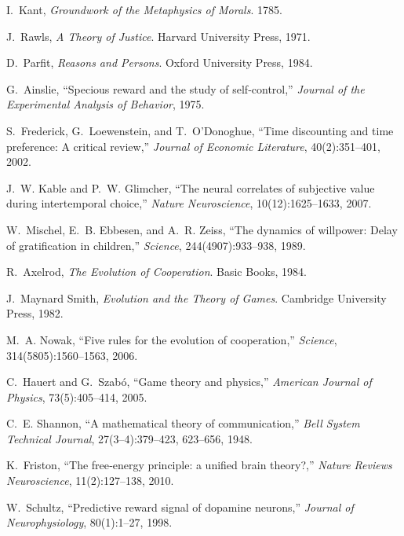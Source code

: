 \documentclass[11pt,a4paper]{article}
\begin{document}
\begin{thebibliography}{99}

I.~Kant, \emph{Groundwork of the Metaphysics of Morals}. 1785.

J.~Rawls, \emph{A Theory of Justice}. Harvard University Press, 1971.

D.~Parfit, \emph{Reasons and Persons}. Oxford University Press, 1984.

G.~Ainslie, ``Specious reward and the study of self‐control,'' \emph{Journal of the Experimental Analysis of Behavior}, 1975.

S.~Frederick, G.~Loewenstein, and T.~O’Donoghue, ``Time discounting and time preference: A critical review,'' \emph{Journal of Economic Literature}, 40(2):351–401, 2002.

J.~W. Kable and P.~W. Glimcher, ``The neural correlates of subjective value during intertemporal choice,'' \emph{Nature Neuroscience}, 10(12):1625–1633, 2007.

W.~Mischel, E.~B. Ebbesen, and A.~R. Zeiss, ``The dynamics of willpower: Delay of gratification in children,'' \emph{Science}, 244(4907):933–938, 1989.

R.~Axelrod, \emph{The Evolution of Cooperation}. Basic Books, 1984.

J.~Maynard Smith, \emph{Evolution and the Theory of Games}. Cambridge University Press, 1982.

M.~A. Nowak, ``Five rules for the evolution of cooperation,'' \emph{Science}, 314(5805):1560–1563, 2006.

C.~Hauert and G.~Szab\'o, ``Game theory and physics,'' \emph{American Journal of Physics}, 73(5):405–414, 2005.

C.~E. Shannon, ``A mathematical theory of communication,'' \emph{Bell System Technical Journal}, 27(3–4):379–423, 623–656, 1948.

K.~Friston, ``The free‐energy principle: a unified brain theory?,'' \emph{Nature Reviews Neuroscience}, 11(2):127–138, 2010.

W.~Schultz, ``Predictive reward signal of dopamine neurons,'' \emph{Journal of Neurophysiology}, 80(1):1–27, 1998.


\end{thebibliography}
\end{document}
